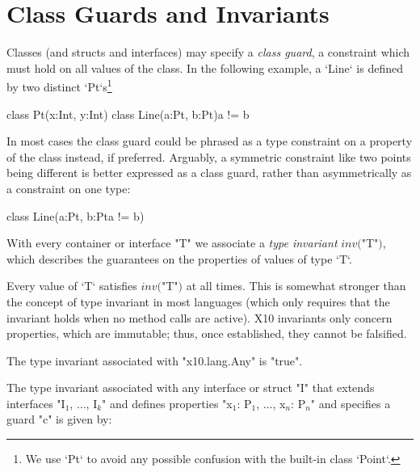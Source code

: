 \section{Class Guards and Invariants}\label{DepType:ClassGuard}


Classes (and structs and interfaces) may specify a {\em class guard}, a
constraint which must hold on all values of the class.    In the following
example, a \xcd`Line` is defined by two distinct \xcd`Pt`s\footnote{We use \xcd`Pt`
to avoid any possible confusion with the built-in class \xcd`Point`.}
\begin{xten}
class Pt(x:Int, y:Int){}
class Line(a:Pt, b:Pt){a != b} {}
\end{xten}
%

In most cases the class guard could be phrased as a type constraint on a property of
the class instead, if preferred.  Arguably, a symmetric constraint like two
points being different is better expressed as a class guard, rather than
asymmetrically as a constraint on one type: 
\begin{xten}
class Line(a:Pt, b:Pt{a != b}) {}
\end{xten}
%



\label{DepType:TypeInvariant}
\label{DepType:ClassGuardDef}



With every container  or interface \xcd"T" we associate a {\em type
invariant} $\mathit{inv}($\xcd"T"$)$, which describes the guarantees on the
properties of values of type \xcd`T`.  

Every value of \xcd`T` satisfies $\mathit{inv}($\xcd"T"$)$ at all times.  This
is somewhat stronger than the concept of type invariant in most languages
(which only requires that the invariant holds when no method calls are
active).  X10 invariants only concern properties, which are immutable; thus,
once established, they cannot be falsified.

The type
invariant associated with \xcd"x10.lang.Any"
is 
\xcd"true".

The type invariant associated with any interface or struct \xcd"I" that extends
interfaces \xcdmath"I$_1$, $\dots$, I$_k$" and defines properties
\xcdmath"x$_1$: P$_1$, $\dots$, x$_n$: P$_n$" and
specifies a guard \xcd"c" is given by:

